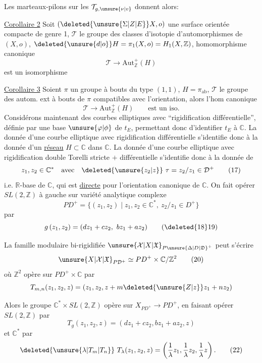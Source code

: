 Les marteaux-pilons sur les $\mathcal T_{g,\unsure{\nu|v}}$ donnent alors:

\uline{Corollaire 2} Soit $(\deleted{\unsure{\Sigma|Z|E}}X,o)$ une surface orientée compacte de genre 1, $\mathcal T$ le groupe des classes d'isotopie d'automorphismes de $(X,o)$, $\deleted{\unsure{d|o}}H=\pi_1(X,o)=H_1(X,\mathbb Z)$,   homomorphisme canonique
\[
\mathcal T\longrightarrow\mathrm{Aut}^{+}_{\mathbb Z}(H)\tag*{(16)}
\]
est un isomorphisme

\uline{Corollaire 3} Soient $\pi$ un groupe à bouts du type $(1,1)$, $H=\pi_{\mathrm{ab}}$, $\mathcal T$ le groupe des autom. ext à bouts de $\pi$ compatibles avec l'orientation, alors l'hom canonique
\[
\mathcal T\longrightarrow\mathrm{Aut}^{+}_{\mathbb Z}(H)\qquad\text{est un iso.}
\]
Considérons maintenant des courbes elliptiques  avec ``rigidification différentielle'', définie par une base $\unsure{\varphi|\phi}$ de $t_E$, permettant donc d'identifier $t_E$ à $\mathbb C$. La donnée d'une courbe elliptique avec rigidification différentielle s'identifie donc à la donnée d'un \uline{réseau} $H\subset\mathbb C$ dans $\mathbb C$. La donnée d'une courbe elliptique avec rigidification double Torelli stricte $+$ différentielle s'identifie donc à la donnée de
\[
z_1,z_2\in\mathbb C^*\quad\text{avec}\quad
\deleted{\unsure{z_2|z}}\ \tau=z_2/z_1\in\mathcal D^+\tag*{(17)}
\]
i.e.  $\mathbb R$-base de $\mathbb C$, qui est \uline{directe} pour l'orientation canonique de $\mathbb C$. On fait opérer $SL(2,\mathbb Z)$ à gauche sur  variété analytique complexe
\[
PD^+=\{(z_1,z_2)\mid z_1,z_2\in\mathbb C^*,\ z_2/z_1\in D^+\}\tag*{(18)}
\]
par
\[
g\,(z_1,z_2)=(dz_1+cz_2,\ bz_1+az_2)\tag*{(\deleted{18}19)}
\]

La famille modulaire bi-rigidifiée $\unsure{\mathcal X|X|\mathfrak X}_{P\unsure{\Delta|D|\mathfrak D}^+}$ peut s'écrire
\[
\unsure{X|\mathcal X|\mathfrak X}_{P\mathcal D^+}\simeq PD^+\times\mathbb C/\mathbb Z^2\tag*{(20)}
\]
où $\mathbb Z^2$ opère sur $PD^+\times\mathbb C$ par
\[
T_{m,n}(z_1,z_2,z)=(z_1,z_2,z+m\deleted{\unsure{Z|z}}z_1+nz_2)
\]

Alors le groupe $\mathbb C^*\times SL(2,\mathbb Z)$ opère sur $X_{PD^+}\longrightarrow PD^+$, en faisant opérer $SL(2,\mathbb Z)$ par
\[
T_g(z_1,z_2,z)=(dz_1+cz_2,bz_1+az_2,z)\tag*{(21)}
\]
et $\mathbb C^*$  par
\[
\deleted{\unsure{\lambda|T_m|T_n}}\ T_\lambda(z_1,z_2,z)=\left(\frac{1}{\lambda}z_1,\frac{1}{\lambda}z_2,\frac{1}{\lambda}z\right).\tag*{(22)}
\]

